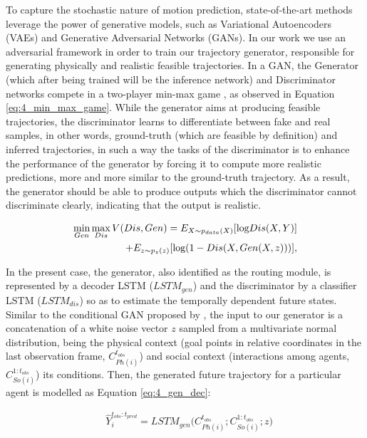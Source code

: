 To capture the stochastic nature of motion prediction, state-of-the-art methods leverage the power of generative models, such as Variational Autoencoders (VAEs) and Generative Adversarial Networks (GANs). In our work we use an adversarial framework in order to train our trajectory generator, responsible for generating physically and realistic feasible trajectories. In a GAN, the Generator (which after being trained will be the inference network) and Discriminator networks compete in a two-player min-max game \cite{goodfellow2020generative}, as observed in Equation \ref{eq:4_min_max_game}. While the generator aims at producing feasible trajectories, the discriminator learns to differentiate between fake and real samples, in other words, ground-truth (which are feasible by definition) and inferred trajectories, in such a way the tasks of the discriminator is to enhance the performance of the generator by forcing it to compute more realistic predictions, more and more similar to the ground-truth trajectory. As a result, the generator should be able to produce outputs which the discriminator cannot discriminate clearly, indicating that the output is realistic. 

\begin{eqnarray}
	\label{eq:4_min_max_game}
	&&\hspace{-10mm} \min_{Gen} \max_{Dis} V(Dis, Gen)=E_{X \sim p_{data}(X)}[\mbox{log} Dis(X,Y)] \nonumber \\
	&&\hspace{15mm} + E_{z \sim p_z(z)}[\mbox{log} (1 - Dis(X, Gen(X,z)))],
\end{eqnarray}

In the present case, the generator, also identified as the routing module, is represented by a decoder LSTM  ($LSTM_{gen}$) and the discriminator by a classifier LSTM ($LSTM_{dis}$) so as to estimate the temporally dependent future states. Similar to the conditional GAN proposed by \cite{sadeghian2019sophie}, the input to our generator is a concatenation of a white noise vector $z$ sampled from a multivariate normal distribution, being the physical context (goal points in relative coordinates in the last observation frame, $C_{Ph(i)}^{t_{obs}}$) and social context (interactions among agents, $C_{So(i)}^{1:t_{obs}}$) its conditions. Then, the generated future trajectory for a particular agent is modelled as Equation \ref{eq:4_gen_dec}:

\begin{eqnarray}
	\label{eq:4_gen_dec}
	& \hat{Y}_i^{t_{obs}:t_{pred}} = LSTM_{gen}\big(C_{Ph(i)}^{t_{obs}}; C_{So(i)}^{1:t_{obs}}; z\big)
\end{eqnarray}

